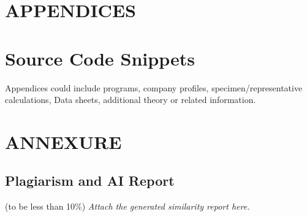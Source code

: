 \chapter*{APPENDICES}
\appendix

\chapter{Source Code Snippets}
Appendices could include programs, company profiles, specimen/representative calculations, Data sheets, additional theory or related information.

\chapter{ANNEXURE}
\section*{Plagiarism and AI Report}
(to be less than 10\%) 
\textit{Attach the generated similarity report here.}